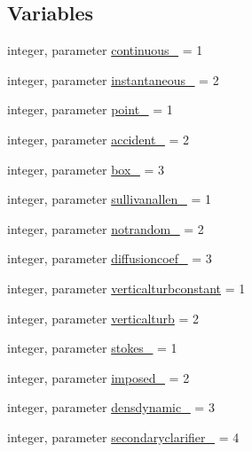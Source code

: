 \subsection*{Variables}
\begin{DoxyCompactItemize}
\item 
integer, parameter \mbox{\hyperlink{namespacemodulelagrangianglobal_a8b61ce3f8682c62861a88116a3e996c6}{continuous\+\_\+}} = 1
\item 
integer, parameter \mbox{\hyperlink{namespacemodulelagrangianglobal_afa4d16ff75a79465c9bad1ce386b605b}{instantaneous\+\_\+}} = 2
\item 
integer, parameter \mbox{\hyperlink{namespacemodulelagrangianglobal_a0e2936c4d3f8756df7e69214d86a68c8}{point\+\_\+}} = 1
\item 
integer, parameter \mbox{\hyperlink{namespacemodulelagrangianglobal_aea177a9f2e4ac66e9e8d3e3cc735e14e}{accident\+\_\+}} = 2
\item 
integer, parameter \mbox{\hyperlink{namespacemodulelagrangianglobal_abe305c7d37832b25e3f952623443842c}{box\+\_\+}} = 3
\item 
integer, parameter \mbox{\hyperlink{namespacemodulelagrangianglobal_a08e467932d6264897e16243598eade92}{sullivanallen\+\_\+}} = 1
\item 
integer, parameter \mbox{\hyperlink{namespacemodulelagrangianglobal_aeccfb91984729b43583821dc3314c765}{notrandom\+\_\+}} = 2
\item 
integer, parameter \mbox{\hyperlink{namespacemodulelagrangianglobal_af88469420eef680ce4bde3a381893f5e}{diffusioncoef\+\_\+}} = 3
\item 
integer, parameter \mbox{\hyperlink{namespacemodulelagrangianglobal_a7237091b820cfbc8c5aadba900d61813}{verticalturbconstant}} = 1
\item 
integer, parameter \mbox{\hyperlink{namespacemodulelagrangianglobal_adf99dcbdc7860d8dcaced69e07c2d8d0}{verticalturb}} = 2
\item 
integer, parameter \mbox{\hyperlink{namespacemodulelagrangianglobal_aee916b695fb6fabe1750e407b2ea2806}{stokes\+\_\+}} = 1
\item 
integer, parameter \mbox{\hyperlink{namespacemodulelagrangianglobal_aaec25ae6657916add7716bbb766aa5c2}{imposed\+\_\+}} = 2
\item 
integer, parameter \mbox{\hyperlink{namespacemodulelagrangianglobal_abe64a05fa9af355ff5e3e7e39a9f8064}{densdynamic\+\_\+}} = 3
\item 
integer, parameter \mbox{\hyperlink{namespacemodulelagrangianglobal_ae7de72ded06a4d5672eda68f51893fe3}{secondaryclarifier\+\_\+}} = 4

\end{DoxyCompactItemize}
